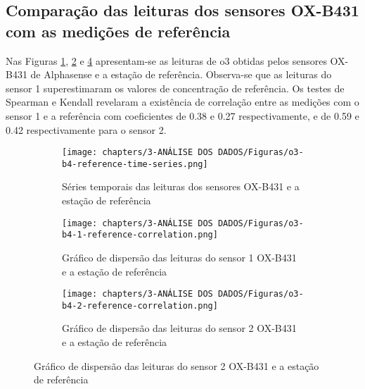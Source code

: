 \subsection{Comparação das leituras dos sensores OX-B431 com as medições de referência}

Nas Figuras \ref{fig:data-o3-reference-time-series}, \ref{fig:data-o3-1-reference-corr} e \ref{fig:data-o3-2-reference-corr} apresentam-se as leituras de \acrshort{o3} obtidas pelos sensores OX-B431 de Alphasense e a estação de referência. Observa-se que as leituras do sensor 1 superestimaram os valores de concentração de referência. Os testes de Spearman e Kendall revelaram a existência de correlação entre as medições com o sensor 1 e a referência com coeficientes de 0.38 e 0.27 respectivamente, e de 0.59 e 0.42 respectivamente para o sensor 2.

\begin{figure}[h]
    \centering
    \caption{Séries temporais e gráficos de dispersão das medições de \acrshort{o3}}
    \begin{subfigure}{0.47\textwidth}
        \texttt{[image: chapters/3-ANÁLISE DOS DADOS/Figuras/o3-b4-reference-time-series.png]}
        \caption{Séries temporais das leituras dos sensores OX-B431 e a estação de referência}
        \label{fig:data-o3-reference-time-series}
    \end{subfigure}
    \hfill
    \begin{subfigure}{0.49\textwidth}
        \texttt{[image: chapters/3-ANÁLISE DOS DADOS/Figuras/o3-b4-1-reference-correlation.png]}
        \caption{Gráfico de dispersão das leituras do sensor 1 OX-B431 e a estação de referência}
        \label{fig:data-o3-1-reference-corr}
    \end{subfigure}
    \hfill
    \begin{subfigure}{0.5\textwidth}
        \texttt{[image: chapters/3-ANÁLISE DOS DADOS/Figuras/o3-b4-2-reference-correlation.png]}
        \caption{Gráfico de dispersão das leituras do sensor 2 OX-B431 e a estação de referência}
        \label{fig:data-o3-2-reference-corr}
    \end{subfigure}
\end{figure}